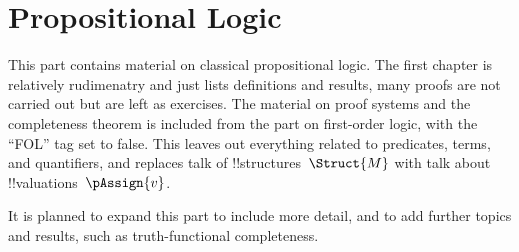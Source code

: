 \documentclass[../../include/open-logic-part]{subfiles}
\begin{document}
\part{Propositional Logic}

\begin{editorial}
  This part contains material on classical propositional logic. The
  first chapter is relatively rudimenatry and just lists definitions
  and results, many proofs are not carried out but are left as
  exercises. The material on proof systems and the completeness
  theorem is included from the part on first-order logic, with the
  ``FOL'' tag set to false. This leaves out everything related to
  predicates, terms, and quantifiers, and replaces talk of
  !!{structure}s~$\Struct{M}$ with talk about
  !!{valuation}s~$\pAssign{v}$.

  It is planned to expand this part to include
  more detail, and to add further topics and results, such as
  truth-functional completeness.
\end{editorial}










\OLEndPartHook
\end{document}
